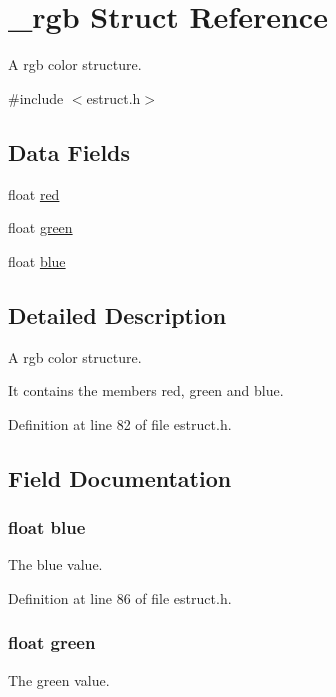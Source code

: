 \hypertarget{struct__rgb}{\section{\-\_\-rgb Struct Reference}
\label{struct__rgb}
}


A rgb color structure.  




{\ttfamily \#include $<$estruct.\-h$>$}

\subsection*{Data Fields}
\begin{DoxyCompactItemize}
\item 
float \hyperlink{struct__rgb_acddf4f34ba92c602d4205ba50e98d603}{red}
\item 
float \hyperlink{struct__rgb_af8d69af46156237d69b44a880e4f486e}{green}
\item 
float \hyperlink{struct__rgb_a322e0de27f54901aa172ae487dba2914}{blue}
\end{DoxyCompactItemize}


\subsection{Detailed Description}
A rgb color structure. 

It contains the members red, green and blue. 

Definition at line 82 of file estruct.\-h.



\subsection{Field Documentation}
\hypertarget{struct__rgb_a322e0de27f54901aa172ae487dba2914}{
\subsubsection[{blue}]{\setlength{\rightskip}{0pt plus 5cm}float blue}}\label{struct__rgb_a322e0de27f54901aa172ae487dba2914}
The blue value. 

Definition at line 86 of file estruct.\-h.

\hypertarget{struct__rgb_af8d69af46156237d69b44a880e4f486e}{
\subsubsection[{green}]{\setlength{\rightskip}{0pt plus 5cm}float green}}\label{struct__rgb_af8d69af46156237d69b44a880e4f486e}
The green value. 

